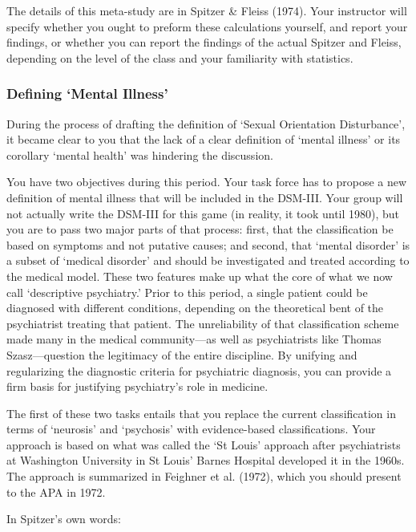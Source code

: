 \begin{refsection}
\begin{itemize}
\end{itemize}

The details of this meta-study are in Spitzer \& Fleiss (1974). Your instructor will specify whether you ought to preform these calculations yourself, and report your findings, or whether you can report the findings of the actual Spitzer and Fleiss, depending on the level of the class and your familiarity with statistics.

\subsubsection{Defining `Mental Illness'}
\label{definingmentalillness}

During the process of drafting the definition of `Sexual Orientation Disturbance', it became clear to you that the lack of a clear definition of `mental illness' or its corollary `mental health' was hindering the discussion.

You have two objectives during this period. Your task force has to propose a new definition of mental illness that will be included in the DSM-III. Your group will not actually write the DSM-III for this game (in reality, it took until 1980), but you are to pass two major parts of that process: first, that the classification be based on symptoms and not putative causes; and second, that `mental disorder' is a subset of `medical disorder' and should be investigated and treated according to the medical model. These two features make up what the core of what we now call `descriptive psychiatry.' Prior to this period, a single patient could be diagnosed with different conditions, depending on the theoretical bent of the psychiatrist treating that patient. The unreliability of that classification scheme made many in the medical community—as well as psychiatrists like Thomas Szasz—question the legitimacy of the entire discipline. By unifying and regularizing the diagnostic criteria for psychiatric diagnosis, you can provide a firm basis for justifying psychiatry's role in medicine.

The first of these two tasks entails that you replace the current classification in terms of `neurosis' and `psychosis' with evidence-based classifications. Your approach is based on what was called the `St Louis' approach after psychiatrists at Washington University in St Louis' Barnes Hospital developed it in the 1960s. The approach is summarized in Feighner et al. (1972), which you should present to the APA in 1972.

In Spitzer's own words:


\end{refsection}
